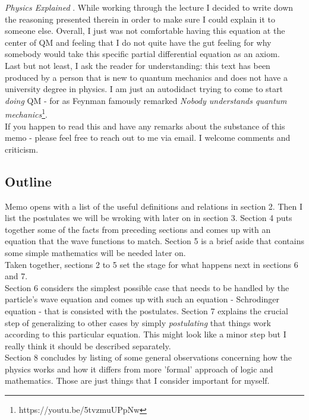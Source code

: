 \documentclass[12pt]{article}
\begin{document}
\textit{Physics Explained} \cite{what_is_the_se}. While working through the lecture I decided to write down the reasoning presented therein in order to make sure I could explain it to someone else. Overall, I just was not 
comfortable having this equation at the center of QM and feeling that I do 
not quite have the gut feeling for why somebody would take this specific partial differential equation as an axiom.
\\ \indent Last but not least, I ask the reader for understanding: this text has been produced by a person that is new to quantum mechanics and does not have a university degree in physics. I am just an autodidact trying to come to start \textit{doing} QM - for as Feynman famously remarked \textit{Nobody understands quantum mechanics}\footnote{https://youtu.be/5tvzmuUPpNw}.
\\ \indent If you happen to read this and have any remarks about the substance of this memo - please feel free to reach out to me via email. I welcome comments and criticism.

\subsection{Outline}
Memo opens with a list of the useful definitions and relations in section 2. Then I list the postulates we will be wroking with later on in section 3. Section 4 puts together some of the facts from preceding sections and comes up with an equation that the wave functions to match. Section 5 is a brief aside that contains some 
simple mathematics will be needed later on. 
\\ \indent Taken together, sections 2 to 5 set the stage for what happens next in sections 6 and 7. 
\\ \indent Section 6 considers the simplest possible case that needs to be handled by the particle's wave equation and comes up with such an equation - Schrodinger equation - that is consisted with the postulates. Section 7 explains the crucial step
of generalizing to other cases by simply \textit{postulating} that things 
work according to this particular equation. This might look like a minor
step but I really think it should be described separately.
\\ \indent Section 8 concludes by listing of some general observations
 concerning how the physics works and how it differs from more 'formal' approach of logic and mathematics. Those are just things that I consider important for myself.
\end{document}

